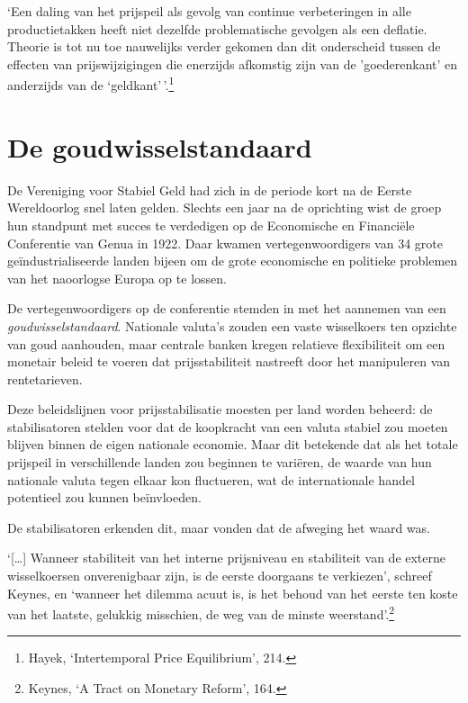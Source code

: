\documentclass[
  a5paper,
  smalldemyvopaper,11pt,twoside,onecolumn,openright,extrafontsizes]{memoir}
\begin{document}
`Een daling van het prijspeil als gevolg van continue verbeteringen in
alle productietakken heeft niet dezelfde problematische gevolgen als een
deflatie. Theorie is tot nu toe nauwelijks verder gekomen dan dit
onderscheid tussen de effecten van prijswijzigingen die enerzijds
afkomstig zijn van de 'goederenkant' en anderzijds van de
`geldkant'\,'.\footnote{\hspace{0pt}Hayek, `Intertemporal Price
  Equilibrium', 214.}

\section{De goudwisselstandaard}\label{de-goudwisselstandaard}

De Vereniging voor Stabiel Geld had zich in de periode kort na de Eerste
Wereldoorlog snel laten gelden. Slechts een jaar na de oprichting wist
de groep hun standpunt met succes te verdedigen op de Economische en
Financiële Conferentie van Genua in 1922. Daar kwamen vertegenwoordigers
van 34 grote geïndustrialiseerde landen bijeen om de grote economische
en politieke problemen van het naoorlogse Europa op te lossen.

De vertegenwoordigers op de conferentie stemden in met het aannemen van
een \emph{goudwisselstandaard}. Nationale valuta's zouden een vaste
wisselkoers ten opzichte van goud aanhouden, maar centrale banken kregen
relatieve flexibiliteit om een monetair beleid te voeren dat
prijsstabiliteit nastreeft door het manipuleren van rentetarieven.

Deze beleidslijnen voor prijsstabilisatie moesten per land worden
beheerd: de stabilisatoren stelden voor dat de koopkracht van een valuta
stabiel zou moeten blijven binnen de eigen nationale economie. Maar dit
betekende dat als het totale prijspeil in verschillende landen zou
beginnen te variëren, de waarde van hun nationale valuta tegen elkaar
kon fluctueren, wat de internationale handel potentieel zou kunnen
beïnvloeden.

De stabilisatoren erkenden dit, maar vonden dat de afweging het waard
was.

`{[}\ldots{]} Wanneer stabiliteit van het interne prijsniveau en
stabiliteit van de externe wisselkoersen onverenigbaar zijn, is de
eerste doorgaans te verkiezen', schreef Keynes, en `wanneer het dilemma
acuut is, is het behoud van het eerste ten koste van het laatste,
gelukkig misschien, de weg van de minste weerstand'.\footnote{\hspace{0pt}Keynes,
  `A Tract on Monetary Reform', 164.}
\end{document}

